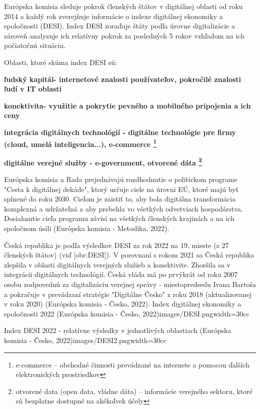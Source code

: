 Európska komisia sleduje pokrok členských štátov v digitálnej oblasti od roku 2014 a každý rok zverejňuje informácie o indexe digitálnej ekonomiky a spoločnosti (DESI). Index DESI zoraďuje štáty podľa úrovne digitalizácie a zároveň analyzuje ich relatívny pokrok za posledných 5 rokov vzhľadom na ich počiatočnú situáciu.

Oblasti, ktoré skúma index DESI sú:

\startitemize
\item{\start\bf ľudský kapitál\stop - internetové znalosti používateľov, pokročilé znalosti ľudí v IT oblasti}
\item{\start\bf konektivita\stop - využitie a pokrytie pevného a mobilného pripojenia a ich ceny}
\item{\start\bf integrácia digitálnych technológií \stop - digitálne technológie pre firmy (cloud, umelá inteligencia...), e-commerce \footnote{e-commerce -- obchodné činnosti prevádzané na internete a pomocou ďalších elektronických prostriedkov}}
\item{\start\bf digitálne verejné služby \stop - e-government, otvorené dáta \footnote{otvorené data (open data, vládne dáta) -- informácie verejného sektoru, ktoré sú bezplatne dostupné na akékoľvek účely}}
\stopitemize 

Európska komisia a Rada prejednávajú rozdhodnutie o politickom programe "Cesta k digitálnej dekáde", ktorý určuje ciele na úrovni EÚ, ktoré majú byť splnené do roku 2030. Cieľom je zaistiť to, aby bola digitálna transformácia komplexná a udržateľná a aby prebehla vo všetkých odvetviach hospodárstva. Dosiahnutie cieľa programu závisí na všetkých členských krajinách a na ich spoločnom úsilí \scr(Európska komisia - Metodika, 2022).

Česká republika je podľa výsledkov DESI za rok 2022 na 19. mieste (z 27 členských štátov) (viď [obr:DESI]). V porovnaní s rokom 2021 sa Česká republika zlepšila v oblasti digitálnych verejných služieb a konektivite. Zhoršila sa v integrácii digitálnych technológií. Česká vláda má po prvýkrát od roku 2007 osobu zodpovednú za digitalizáciu verejnej správy - miestopredsedu Ivana Bartoša  a pokračuje v prevádzaní stratégie "Digitálne Česko" z roku 2018 (aktualizovanej v roku 2020) \scr(Európska komisia - Česko, 2022).
{Index digitálnej ekonomiky a spoločnosti 2022 (Európska komisia - Česko, 2022)}{images/DESI.png}{width=30cc}

{Index DESI 2022 - relatívne výsledky v jednotlivých oblastiach (Európska komisia - Česko, 2022)}{images/DESI2.png}{width=30cc}

